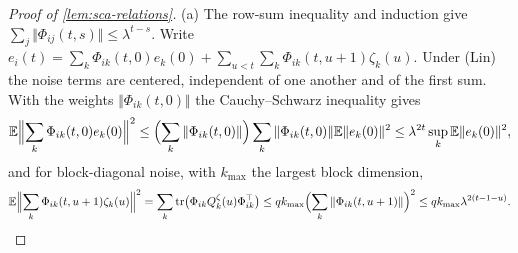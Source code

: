 \begin{proof}[Proof of \cref{lem:sca-relations}]
(a) The row-sum inequality and induction give $\sum_j\Vert\Phi_{ij}(t,s)\Vert\le\lambda^{t-s}$. Write $e_i(t)=\sum_k\Phi_{ik}(t,0)e_k(0)+\sum_{u<t}\sum_k\Phi_{ik}(t,u+1)\zeta_k(u)$. Under \textup{(Lin)} the noise terms are centered, independent of one another and of the first sum. With the weights $\Vert\Phi_{ik}(t,0)\Vert$ the Cauchy--Schwarz inequality gives
\begin{equation*}
\mathbb{E}\Bigl\Vert\sum_k\Phi_{ik}(t,0)e_k(0)\Bigr\Vert^2\le\Bigl(\sum_k\Vert\Phi_{ik}(t,0)\Vert\Bigr)\sum_k\Vert\Phi_{ik}(t,0)\Vert\mathbb{E}\Vert e_k(0)\Vert^2\le\lambda^{2t}\sup_k\mathbb{E}\Vert e_k(0)\Vert^2,
\end{equation*}
and for block-diagonal noise, with $k_{\max}$ the largest block dimension,
\begin{equation*}
\mathbb{E}\Bigl\Vert\sum_k\Phi_{ik}(t,u+1)\zeta_k(u)\Bigr\Vert^2=\sum_k\operatorname{tr}\bigl(\Phi_{ik}Q^\zeta_k(u)\Phi_{ik}^\top\bigr)\le qk_{\max}\Bigl(\sum_k\Vert\Phi_{ik}(t,u+1)\Vert\Bigr)^2\le qk_{\max}\lambda^{2(t-1-u)}.
\end{equation*}

\end{proof}
